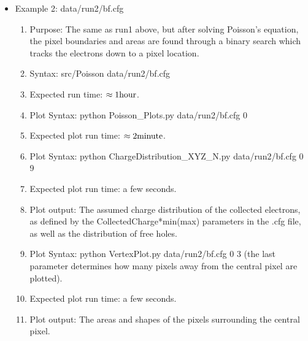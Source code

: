\documentclass{article} %
\begin{document}
\begin{itemize}
      \item Example 2: data/run2/bf.cfg
    \begin{enumerate}
      \item Purpose: The same as run1 above, but after solving Poisson's equation, the pixel boundaries and areas are found through a binary search which tracks the electrons down to a pixel location. 
      \item Syntax: src/Poisson data/run2/bf.cfg
      \item Expected run time: $\rm \approx 1 hour$.
      \item Plot Syntax: python Poisson\_Plots.py data/run2/bf.cfg 0
      \item Expected plot run time: $\rm \approx 2 minute$.
      \item Plot Syntax: python ChargeDistribution\_XYZ\_N.py data/run2/bf.cfg 0 9
      \item Expected plot run time: a few seconds.
      \item Plot output: The assumed charge distribution of the collected electrons, as defined by the CollectedCharge*min(max) parameters in the .cfg file, as well as the distribution of free holes.
      \item Plot Syntax: python VertexPlot.py data/run2/bf.cfg 0 3 (the last parameter determines how many pixels away from the central pixel are plotted).
      \item Expected plot run time: a few seconds.
      \item Plot output: The areas and shapes of the pixels surrounding the central pixel.

    \end{enumerate}


\end{itemize}
\end{document}
